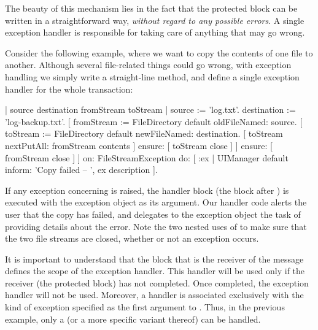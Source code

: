 \documentclass[a4paper,10pt,twoside]{book}
\begin{document}

The beauty of this mechanism lies in the fact that the protected block can be written in  a straightforward way, \emph{without regard to any possible errors}. A single exception handler is responsible for taking care of anything that may go wrong.

Consider the following example, where we want to copy the contents of one file to another.
Although several file-related things could go wrong, with exception handling we simply write a straight-line method, and define a single exception handler for the whole transaction: 
\begin{code}{}
| source destination fromStream toStream |
source := 'log.txt'.
destination := 'log-backup.txt'.
[ fromStream := FileDirectory default oldFileNamed: source.
	[ toStream := FileDirectory default newFileNamed: destination.
		[ toStream nextPutAll: fromStream contents ]
			ensure: [ toStream close ] ]
		ensure: [ fromStream close ] ]
	on: FileStreamException
	do: [ :ex | UIManager default inform: 'Copy failed -- ', ex description ].
\end{code}

If any exception concerning  is raised, the handler block (the block after ) is executed with the exception object as its argument.
Our handler code alerts the user that the copy has failed, and delegates to the exception object  the task of providing details about the error.
Note the two nested uses of  to make sure that the two file streams are closed, whether or not an exception occurs.

It is important to understand  that the block that is the receiver of the message  defines the scope of the exception handler. This handler will be used only if the receiver (\ie the protected block) has not completed. Once completed, the exception handler will not be used. Moreover, a handler is associated exclusively with the kind of exception specified as the first argument to . 
Thus, in the previous example, only a  (or a more specific variant thereof) can be handled.
\end{document}
